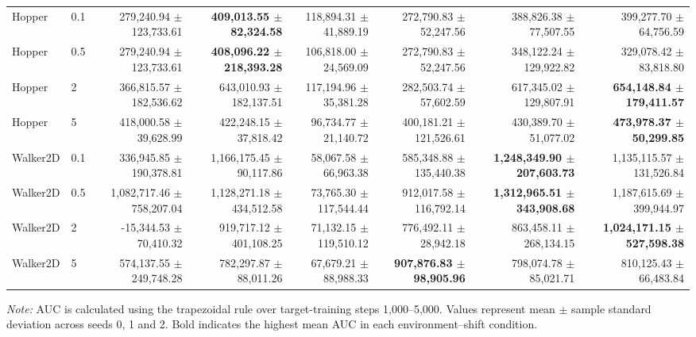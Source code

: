 \begin{table}[htbp]
\begin{adjustbox}{max width=\textwidth}
\begin{tabular}{llrrrrrr}
\midrule
Hopper & 0.1 & 279,240.94 $\pm$ 123,733.61 & \textbf{409,013.55 $\pm$ 82,324.58} & 118,894.31 $\pm$ 41,889.19 & 272,790.83 $\pm$ 52,247.56 & 388,826.38 $\pm$ 77,507.55 & 399,277.70 $\pm$ 64,756.59 \\
Hopper & 0.5 & 279,240.94 $\pm$ 123,733.61 & \textbf{408,096.22 $\pm$ 218,393.28} & 106,818.00 $\pm$ 24,569.09 & 272,790.83 $\pm$ 52,247.56 & 348,122.24 $\pm$ 129,922.82 & 329,078.42 $\pm$ 83,818.80 \\
Hopper & 2 & 366,815.57 $\pm$ 182,536.62 & 643,010.93 $\pm$ 182,137.51 & 117,194.96 $\pm$ 35,381.28 & 282,503.74 $\pm$ 57,602.59 & 617,345.02 $\pm$ 129,807.91 & \textbf{654,148.84 $\pm$ 179,411.57} \\
Hopper & 5 & 418,000.58 $\pm$ 39,628.99 & 422,248.15 $\pm$ 37,818.42 & 96,734.77 $\pm$ 21,140.72 & 400,181.21 $\pm$ 121,526.61 & 430,389.70 $\pm$ 51,077.02 & \textbf{473,978.37 $\pm$ 50,299.85} \\
\midrule
Walker2D & 0.1 & 336,945.85 $\pm$ 190,378.81 & 1,166,175.45 $\pm$ 90,117.86 & 58,067.58 $\pm$ 66,963.38 & 585,348.88 $\pm$ 135,440.38 & \textbf{1,248,349.90 $\pm$ 207,603.73} & 1,135,115.57 $\pm$ 131,526.84 \\
Walker2D & 0.5 & 1,082,717.46 $\pm$ 758,207.04 & 1,128,271.18 $\pm$ 434,512.58 & 73,765.30 $\pm$ 117,544.44 & 912,017.58 $\pm$ 116,792.14 & \textbf{1,312,965.51 $\pm$ 343,908.68} & 1,187,615.69 $\pm$ 399,944.97 \\
Walker2D & 2 & -15,344.53 $\pm$ 70,410.32 & 919,717.12 $\pm$ 401,108.25 & 71,132.15 $\pm$ 119,510.12 & 776,492.11 $\pm$ 28,942.18 & 863,458.11 $\pm$ 268,134.15 & \textbf{1,024,171.15 $\pm$ 527,598.38} \\
Walker2D & 5 & 574,137.55 $\pm$ 249,748.28 & 782,297.87 $\pm$ 88,011.26 & 67,679.21 $\pm$ 88,988.33 & \textbf{907,876.83 $\pm$ 98,905.96} & 798,074.78 $\pm$ 85,021.71 & 810,125.43 $\pm$ 66,483.84 \\
\bottomrule
\end{tabular}
\end{adjustbox}
\begin{flushleft}
\footnotesize \textit{Note:} AUC is calculated using the trapezoidal rule over target-training steps 1,000--5,000. Values represent mean $\pm$ sample standard deviation across seeds 0, 1 and 2. Bold indicates the highest mean AUC in each environment--shift condition.
\end{flushleft}
\end{table}